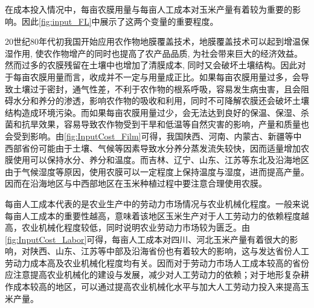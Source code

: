 在成本投入情况中，每亩农膜用量与每亩人工成本对玉米产量有着较为重要的影响。因此\ref{fig:input_FL}中展示了这两个变量的重要程度。

20世纪80年代初我国开始应用农作物地膜覆盖技术，地膜覆盖技术可以起到增温保湿作用, 使农作物增产的同时也提高了农产品品质, 为社会带来巨大的经济效益。然而过多的农膜残留在土壤中也增加了清膜成本, 同时又会破坏土壤结构\cite{可降解农膜在玉米上的应用研究}。因此对于每亩农膜用量而言，收成并不一定与用量成正比。如果每亩农膜用量过多，会导致土壤过于密封，通气性差，不利于农作物的根系呼吸，容易发生病虫害，且会阻碍水分和养分的渗透，影响农作物的吸收和利用，同时不可降解农膜还会破坏土壤结构造成环境污染。而如果每亩农膜用量过少，会无法达到良好的保温、保湿、杀菌和抗旱效果，容易导致农作物受到干旱和低温等自然灾害的影响，产量和质量也会受到影响。由\ref{fig:InputCost_Film}可得，我国陕西、河南、内蒙古、新疆等中西部省份可能由于土壤、气候等因素导致水分养分蒸发流失较快，因而适量增加农膜使用可以保持水分、养分和温度。而吉林、辽宁、山东、江苏等东北及沿海地区由于气候湿度等原因，使用农膜可以一定程度上保持温度与湿度，进而提高产量。因而在沿海地区与中西部地区在玉米种植过程中要注意合理使用农膜。

每亩人工成本代表的是农业生产中的劳动力市场情况与农业机械化程度。一般来说每亩人工成本的重要性越高，意味着该地区玉米生产对于人工劳动力的依赖程度越高，农业机械化程度较低，同时说明农业劳动力市场较为匮乏。由\ref{fig:InputCost_Labor}可得，每亩人工成本对四川、河北玉米产量有着很大的影响，对陕西、山东、江苏等中部及沿海省份也有着较大的影响，这与发达省份人工劳动力成本高及农业机械化程度均有关。因而对于劳动力市场人工成本较高的省份应注意提高农业机械化的建设与发展，减少对人工劳动力的依赖；对于地形复杂耕作成本较高的地区，可以通过提高农业机械化水平与加大人工劳动力投入来提高玉米产量。


